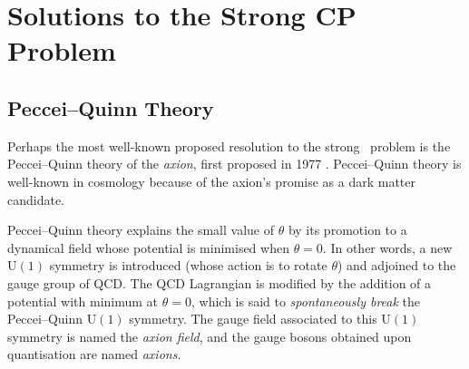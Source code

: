 \chapter{Solutions to the Strong CP Problem}

\section{Peccei--Quinn Theory}

Perhaps the most well-known proposed resolution to the strong \CP\ problem is the Peccei--Quinn theory of the \emph{axion}, first proposed in 1977 \cite{PecceiQuin_1977}.
Peccei--Quinn theory is well-known in cosmology because of the axion's promise as a dark matter candidate.

Peccei--Quinn theory explains the small value of $\theta$ by its promotion to a dynamical field whose potential is minimised when $\theta = 0$.
In other words, a new $\mathrm{U}(1)$ symmetry is introduced (whose action is to rotate $\theta$) and adjoined to the gauge group of QCD.
The QCD Lagrangian is modified by the addition of a potential with minimum at $\theta = 0$, which is said to \emph{spontaneously break} the Peccei--Quinn $\mathrm{U}(1)$ symmetry.
The gauge field associated to this $\mathrm{U}(1)$ symmetry is named the \emph{axion field}, and the gauge bosons obtained upon quantisation are named \emph{axions}.


